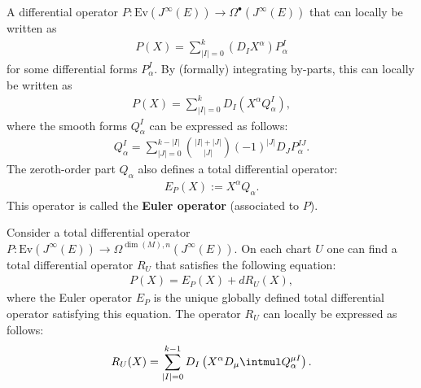     \begin{property}
        A differential operator $P:\mathrm{Ev}(J^\infty(E))\rightarrow\Omega^\bullet(J^\infty(E))$ that can locally be written as
        \begin{gather}
            P(X) = \sum_{|I|=0}^k\left(D_IX^\alpha\right)P^I_\alpha
        \end{gather}
        for some differential forms $P^I_\alpha$. By (formally) integrating by-parts, this can locally be written as
        \begin{gather}
            P(X) = \sum_{|I|=0}^kD_I\left(X^\alpha Q^I_\alpha\right),
        \end{gather}
        where the smooth forms $Q^I_\alpha$ can be expressed as follows:
        \begin{gather}
            \label{var:Q_forms}
            Q^I_\alpha = \sum_{|J|=0}^{k-|I|}\binom{|I|+|J|}{|J|}(-1)^{|J|}D_JP^{IJ}_\alpha.
        \end{gather}
        The zeroth-order part $Q_\alpha$ also defines a total differential operator:
        \begin{gather}
            E_P(X) := X^\alpha Q_\alpha.
        \end{gather}
        This operator is called the \textbf{Euler operator} (associated to $P$).
    \end{property}
    \begin{property}\label{var:differential_operator_decomposition}
        Consider a total differential operator $P:\mathrm{Ev}(J^\infty(E))\rightarrow\Omega^{\dim(M),n}(J^\infty(E))$. On each chart $U$ one can find a total differential operator $R_U$ that satisfies the following equation:
        \begin{gather}
            P(X) = E_P(X) + dR_U(X),
        \end{gather}
        where the Euler operator $E_P$ is the unique globally defined total differential operator satisfying this equation. The operator $R_U$ can locally be expressed as follows:
        \begin{gather}
            R_U(X) = \sum_{|I|=0}^{k-1}D_I\left(X^\alpha D_\mu\intmul Q^{\mu I}_\alpha\right).
        \end{gather}
    \end{property}


